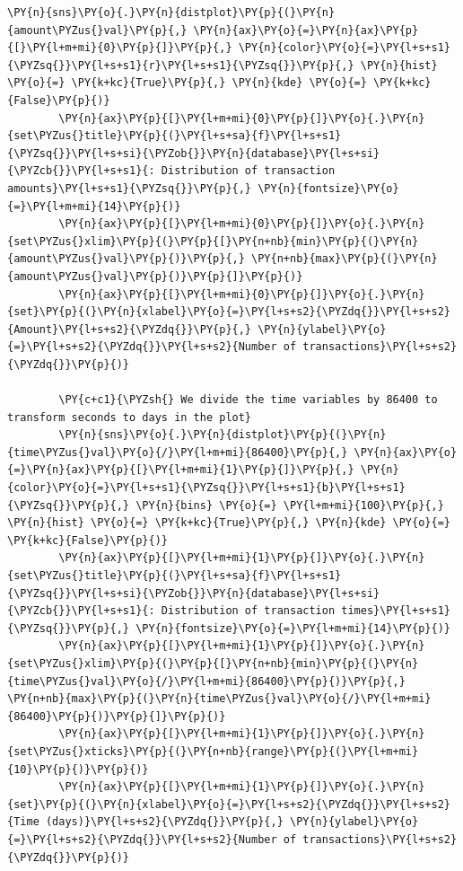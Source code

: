 \begin{tcolorbox}[breakable, size=fbox, boxrule=1pt, pad at break*=1mm,colback=cellbackground, colframe=cellborder]
\begin{Verbatim}[commandchars=\\\{\}]
        \PY{n}{sns}\PY{o}{.}\PY{n}{distplot}\PY{p}{(}\PY{n}{amount\PYZus{}val}\PY{p}{,} \PY{n}{ax}\PY{o}{=}\PY{n}{ax}\PY{p}{[}\PY{l+m+mi}{0}\PY{p}{]}\PY{p}{,} \PY{n}{color}\PY{o}{=}\PY{l+s+s1}{\PYZsq{}}\PY{l+s+s1}{r}\PY{l+s+s1}{\PYZsq{}}\PY{p}{,} \PY{n}{hist} \PY{o}{=} \PY{k+kc}{True}\PY{p}{,} \PY{n}{kde} \PY{o}{=} \PY{k+kc}{False}\PY{p}{)}
        \PY{n}{ax}\PY{p}{[}\PY{l+m+mi}{0}\PY{p}{]}\PY{o}{.}\PY{n}{set\PYZus{}title}\PY{p}{(}\PY{l+s+sa}{f}\PY{l+s+s1}{\PYZsq{}}\PY{l+s+si}{\PYZob{}}\PY{n}{database}\PY{l+s+si}{\PYZcb{}}\PY{l+s+s1}{: Distribution of transaction amounts}\PY{l+s+s1}{\PYZsq{}}\PY{p}{,} \PY{n}{fontsize}\PY{o}{=}\PY{l+m+mi}{14}\PY{p}{)}
        \PY{n}{ax}\PY{p}{[}\PY{l+m+mi}{0}\PY{p}{]}\PY{o}{.}\PY{n}{set\PYZus{}xlim}\PY{p}{(}\PY{p}{[}\PY{n+nb}{min}\PY{p}{(}\PY{n}{amount\PYZus{}val}\PY{p}{)}\PY{p}{,} \PY{n+nb}{max}\PY{p}{(}\PY{n}{amount\PYZus{}val}\PY{p}{)}\PY{p}{]}\PY{p}{)}
        \PY{n}{ax}\PY{p}{[}\PY{l+m+mi}{0}\PY{p}{]}\PY{o}{.}\PY{n}{set}\PY{p}{(}\PY{n}{xlabel}\PY{o}{=}\PY{l+s+s2}{\PYZdq{}}\PY{l+s+s2}{Amount}\PY{l+s+s2}{\PYZdq{}}\PY{p}{,} \PY{n}{ylabel}\PY{o}{=}\PY{l+s+s2}{\PYZdq{}}\PY{l+s+s2}{Number of transactions}\PY{l+s+s2}{\PYZdq{}}\PY{p}{)}
        
        \PY{c+c1}{\PYZsh{} We divide the time variables by 86400 to transform seconds to days in the plot}
        \PY{n}{sns}\PY{o}{.}\PY{n}{distplot}\PY{p}{(}\PY{n}{time\PYZus{}val}\PY{o}{/}\PY{l+m+mi}{86400}\PY{p}{,} \PY{n}{ax}\PY{o}{=}\PY{n}{ax}\PY{p}{[}\PY{l+m+mi}{1}\PY{p}{]}\PY{p}{,} \PY{n}{color}\PY{o}{=}\PY{l+s+s1}{\PYZsq{}}\PY{l+s+s1}{b}\PY{l+s+s1}{\PYZsq{}}\PY{p}{,} \PY{n}{bins} \PY{o}{=} \PY{l+m+mi}{100}\PY{p}{,} \PY{n}{hist} \PY{o}{=} \PY{k+kc}{True}\PY{p}{,} \PY{n}{kde} \PY{o}{=} \PY{k+kc}{False}\PY{p}{)}
        \PY{n}{ax}\PY{p}{[}\PY{l+m+mi}{1}\PY{p}{]}\PY{o}{.}\PY{n}{set\PYZus{}title}\PY{p}{(}\PY{l+s+sa}{f}\PY{l+s+s1}{\PYZsq{}}\PY{l+s+si}{\PYZob{}}\PY{n}{database}\PY{l+s+si}{\PYZcb{}}\PY{l+s+s1}{: Distribution of transaction times}\PY{l+s+s1}{\PYZsq{}}\PY{p}{,} \PY{n}{fontsize}\PY{o}{=}\PY{l+m+mi}{14}\PY{p}{)}
        \PY{n}{ax}\PY{p}{[}\PY{l+m+mi}{1}\PY{p}{]}\PY{o}{.}\PY{n}{set\PYZus{}xlim}\PY{p}{(}\PY{p}{[}\PY{n+nb}{min}\PY{p}{(}\PY{n}{time\PYZus{}val}\PY{o}{/}\PY{l+m+mi}{86400}\PY{p}{)}\PY{p}{,} \PY{n+nb}{max}\PY{p}{(}\PY{n}{time\PYZus{}val}\PY{o}{/}\PY{l+m+mi}{86400}\PY{p}{)}\PY{p}{]}\PY{p}{)}
        \PY{n}{ax}\PY{p}{[}\PY{l+m+mi}{1}\PY{p}{]}\PY{o}{.}\PY{n}{set\PYZus{}xticks}\PY{p}{(}\PY{n+nb}{range}\PY{p}{(}\PY{l+m+mi}{10}\PY{p}{)}\PY{p}{)}
        \PY{n}{ax}\PY{p}{[}\PY{l+m+mi}{1}\PY{p}{]}\PY{o}{.}\PY{n}{set}\PY{p}{(}\PY{n}{xlabel}\PY{o}{=}\PY{l+s+s2}{\PYZdq{}}\PY{l+s+s2}{Time (days)}\PY{l+s+s2}{\PYZdq{}}\PY{p}{,} \PY{n}{ylabel}\PY{o}{=}\PY{l+s+s2}{\PYZdq{}}\PY{l+s+s2}{Number of transactions}\PY{l+s+s2}{\PYZdq{}}\PY{p}{)}
    

\end{Verbatim}
\end{tcolorbox}
